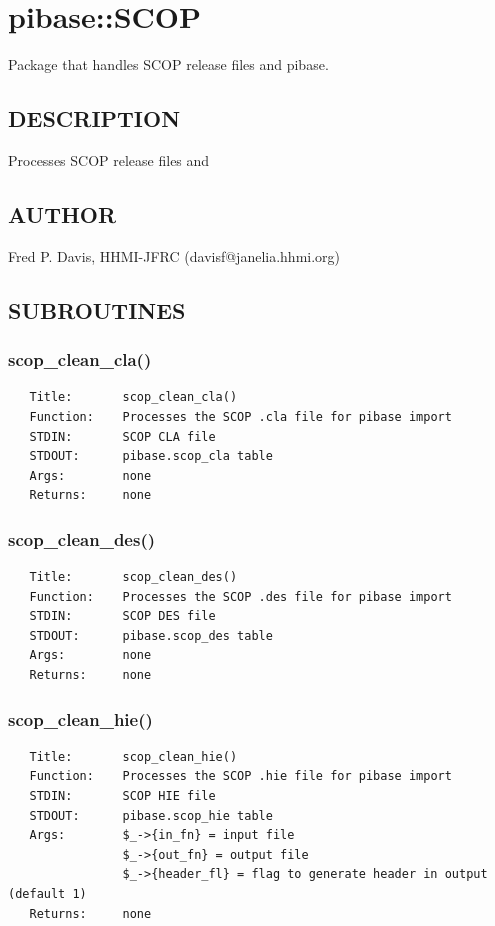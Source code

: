 \documentclass{article}
\begin{document}
\section{pibase::SCOP\label{pibase::SCOP}}


Package that handles SCOP release files and pibase.

\subsection*{DESCRIPTION\label{pibase::SCOP_DESCRIPTION}}


Processes SCOP release files and

\subsection*{AUTHOR\label{pibase::SCOP_AUTHOR}}


Fred P. Davis, HHMI-JFRC (davisf@janelia.hhmi.org)

\subsection*{SUBROUTINES\label{pibase::SCOP_SUBROUTINES}}
\subsubsection*{scop\_clean\_cla()\label{pibase::SCOP_scop_clean_cla_}}
\begin{verbatim}
   Title:       scop_clean_cla()
   Function:    Processes the SCOP .cla file for pibase import
   STDIN:       SCOP CLA file
   STDOUT:      pibase.scop_cla table
   Args:        none
   Returns:     none
\end{verbatim}
\subsubsection*{scop\_clean\_des()\label{pibase::SCOP_scop_clean_des_}}
\begin{verbatim}
   Title:       scop_clean_des()
   Function:    Processes the SCOP .des file for pibase import
   STDIN:       SCOP DES file
   STDOUT:      pibase.scop_des table
   Args:        none
   Returns:     none
\end{verbatim}
\subsubsection*{scop\_clean\_hie()\label{pibase::SCOP_scop_clean_hie_}}
\begin{verbatim}
   Title:       scop_clean_hie()
   Function:    Processes the SCOP .hie file for pibase import
   STDIN:       SCOP HIE file
   STDOUT:      pibase.scop_hie table
   Args:        $_->{in_fn} = input file
                $_->{out_fn} = output file
                $_->{header_fl} = flag to generate header in output (default 1)
   Returns:     none
\end{verbatim}
\end{document}
